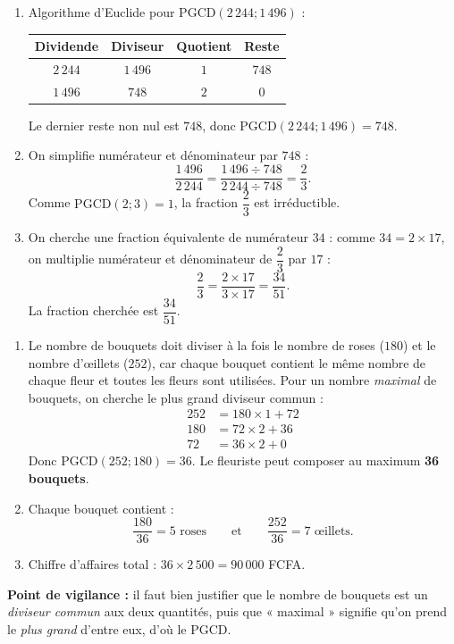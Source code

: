 \documentclass[11pt]{article}
\newcommand{\cle}[1]{{\popxbold\color{popdark}#1}}
\begin{document}
\begin{corrige}
\begin{enumerate}
    \item Algorithme d'Euclide pour $\text{PGCD}(2\,244 ; 1\,496)$ :
    \begin{center}
    \begin{tabular}{|c|c|c|c|}
    \hline
    \rowcolor{popblueL} \textbf{Dividende} & \textbf{Diviseur} & \textbf{Quotient} & \textbf{Reste} \\
    \hline
    $2\,244$ & $1\,496$ & $1$ & $748$ \\
    \hline
    $1\,496$ & $748$ & $2$ & $0$ \\
    \hline
    \end{tabular}
    \end{center}
    Le dernier reste non nul est $748$, donc $\text{PGCD}(2\,244 ; 1\,496) = 748$.
    \item On simplifie numérateur et dénominateur par $748$ :
    \[ \dfrac{1\,496}{2\,244} = \dfrac{1\,496 \div 748}{2\,244 \div 748} = \dfrac{2}{3}. \]
    Comme $\text{PGCD}(2 ; 3) = 1$, la fraction $\dfrac{2}{3}$ est \cle{irréductible}.
    \item On cherche une fraction équivalente de numérateur $34$ : comme $34 = 2 \times 17$, on multiplie numérateur et dénominateur de $\dfrac{2}{3}$ par $17$ :
    \[ \dfrac{2}{3} = \dfrac{2 \times 17}{3 \times 17} = \dfrac{34}{51}. \]
    La fraction cherchée est $\dfrac{34}{51}$.
\end{enumerate}
\end{corrige}

\begin{corrige}
\begin{enumerate}
    \item Le nombre de bouquets doit diviser à la fois le nombre de roses ($180$) et le nombre d'œillets ($252$), car chaque bouquet contient le même nombre de chaque fleur et toutes les fleurs sont utilisées. Pour un nombre \emph{maximal} de bouquets, on cherche le plus grand diviseur commun :
    \begin{align*}
    252 &= 180 \times 1 + 72 \\
    180 &= 72 \times 2 + 36 \\
    72 &= 36 \times 2 + 0
    \end{align*}
    Donc $\text{PGCD}(252 ; 180) = 36$. Le fleuriste peut composer au maximum \textbf{36 bouquets}.
    \item Chaque bouquet contient :
    \[ \dfrac{180}{36} = 5 \text{ roses} \qquad \text{et} \qquad \dfrac{252}{36} = 7 \text{ œillets.} \]
    \item Chiffre d'affaires total : $36 \times 2\,500 = 90\,000$ FCFA.
\end{enumerate}
\textbf{Point de vigilance :} il faut bien justifier que le nombre de bouquets est un \emph{diviseur commun} aux deux quantités, puis que « maximal » signifie qu'on prend le \emph{plus grand} d'entre eux, d'où le PGCD.
\end{corrige}
\end{document}
